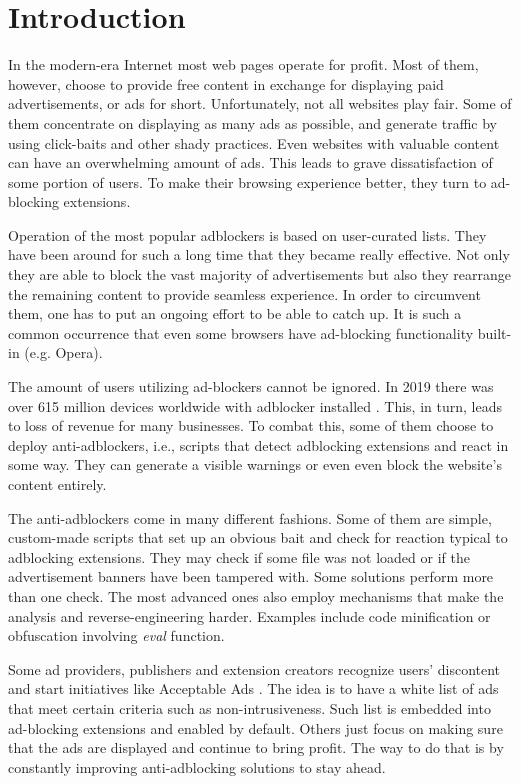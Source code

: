 \chapter*{Introduction}

In the modern-era Internet most web pages operate for profit. Most of them, however, choose to provide free content
in exchange for displaying paid advertisements, or ads for short. Unfortunately, not all websites play fair. Some of them
concentrate on displaying as many ads as possible, and generate traffic by using click-baits 
and other shady practices. Even websites with valuable content can have an overwhelming amount 
of ads. This leads to grave dissatisfaction of some portion of users. To make their browsing experience better,
they turn to ad-blocking extensions.

Operation of the most popular adblockers is based on user-curated lists. They have been around for such a long
time that they became really effective. Not only they are able to block the vast majority of advertisements
but also they rearrange the remaining content to provide seamless experience.
In order to circumvent them, one has to put an ongoing effort to be able
to catch up. It is such a common occurrence that even some browsers have ad-blocking
functionality built-in (e.g. Opera).

The amount of users utilizing ad-blockers cannot be ignored. In 2019 there was over 615 million devices worldwide
with adblocker installed \cite{pagefair:adblock-report}. This, in turn, leads to loss of revenue for many businesses.
To combat this, some of them choose to deploy anti-adblockers, i.e., scripts that detect adblocking extensions
and react in some way. They can generate a visible warnings or even even block the website's content entirely.

The anti-adblockers come in many different fashions. Some of them are simple, custom-made scripts that 
set up an obvious bait and check for reaction typical to adblocking extensions.
They may check if some file was not loaded or if the advertisement banners have been tampered with.
Some solutions perform more than one check. The most advanced ones also employ mechanisms that
make the analysis and reverse-engineering harder. Examples include code minification
or obfuscation involving \emph{eval} function.

Some ad providers, publishers and extension creators recognize users' discontent 
and start initiatives like Acceptable Ads \cite{acceptableads}.
The idea is to have a white list of ads that meet certain criteria such as non-intrusiveness.
Such list is embedded into ad-blocking extensions and enabled by default.
Others just focus on making sure that the ads are displayed and continue to bring profit.
The way to do that is by constantly improving anti-adblocking solutions to stay ahead.


